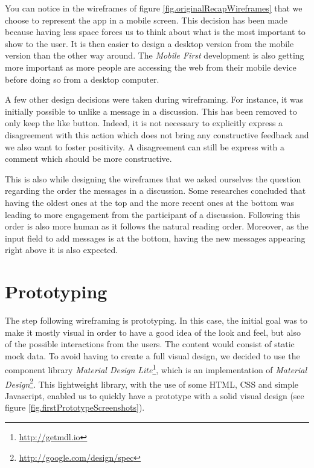 \documentclass[a4paper,12pt, oneside]{article}
\begin{document}
You can notice in the wireframes of figure \ref{fig.originalRecapWireframes} that we choose to represent the app in a mobile screen.
This decision has been made because having less space forces us to think about what is the most important to show to the user.
It is then easier to design a desktop version from the mobile version than the other way around.
The \emph{Mobile First} development is also getting more important as more people are accessing the web from their mobile device before doing so from a desktop computer.

A few other design decisions were taken during wireframing.
For instance, it was initially possible to unlike a message in a discussion.
This has been removed to only keep the like button.
Indeed, it is not necessary to explicitly express a disagreement with this action which does not bring any constructive feedback and we also want to foster positivity.
A disagreement can still be express with a comment which should be more constructive.

This is also while designing the wireframes that we asked ourselves the question regarding the order the messages in a discussion.
Some researches \cite{mabande2010designing} concluded that having the oldest ones at the top and the more recent ones at the bottom was leading to more engagement from the participant of a discussion.
Following this order is also more human as it follows the natural reading order.
Moreover, as the input field to add messages is at the bottom, having the new messages appearing right above it is also expected.


\section{Prototyping}
The step following wireframing is prototyping.
In this case, the initial goal was to make it mostly visual in order to have a good idea of the look and feel, but also of the possible interactions from the users.
The content would consist of static mock data.
To avoid having to create a full visual design, we decided to use the component library \emph{Material Design Lite}\footnote{\url{http://getmdl.io}}, which is an implementation of \emph{Material Design}\footnote{\url{http://google.com/design/spec}}.
This lightweight library, with the use of some HTML, CSS and simple Javascript, enabled us to quickly have a prototype with a solid visual design (see figure \ref{fig.firstPrototypeScreenshots}).
\end{document}
